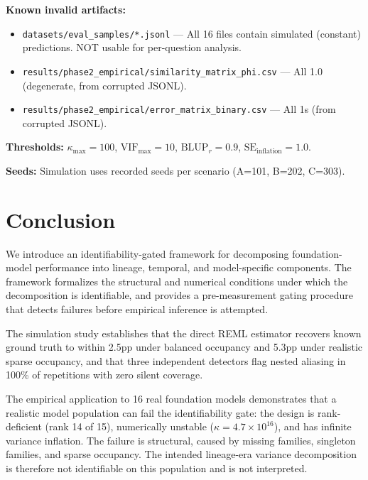 \documentclass[journal]{IEEEtran}
\begin{document}
\textbf{Known invalid artifacts:}
\begin{itemize}
\item \texttt{datasets/eval\_samples/*.jsonl} --- All 16 files contain simulated (constant) predictions. NOT usable for per-question analysis.
\item \texttt{results/phase2\_empirical/similarity\_matrix\_phi.csv} --- All 1.0 (degenerate, from corrupted JSONL).
\item \texttt{results/phase2\_empirical/error\_matrix\_binary.csv} --- All 1s (from corrupted JSONL).
\end{itemize}

\textbf{Thresholds:} $\kappa_{\max} = 100$, $\text{VIF}_{\max} = 10$, $\text{BLUP}_{r} = 0.9$, $\text{SE}_{\text{inflation}} = 1.0$.

\textbf{Seeds:} Simulation uses recorded seeds per scenario (A=101, B=202, C=303).

\section{Conclusion}
\label{sec:conclusion}

We introduce an identifiability-gated framework for decomposing foundation-model performance into lineage, temporal, and model-specific components. The framework formalizes the structural and numerical conditions under which the decomposition is identifiable, and provides a pre-measurement gating procedure that detects failures before empirical inference is attempted.

The simulation study establishes that the direct REML estimator recovers known ground truth to within 2.5pp under balanced occupancy and 5.3pp under realistic sparse occupancy, and that three independent detectors flag nested aliasing in 100\% of repetitions with zero silent coverage.

The empirical application to 16 real foundation models demonstrates that a realistic model population can fail the identifiability gate: the design is rank-deficient (rank 14 of 15), numerically unstable ($\kappa = 4.7 \times 10^{16}$), and has infinite variance inflation. The failure is structural, caused by missing families, singleton families, and sparse occupancy. The intended lineage-era variance decomposition is therefore not identifiable on this population and is not interpreted.
\end{document}
